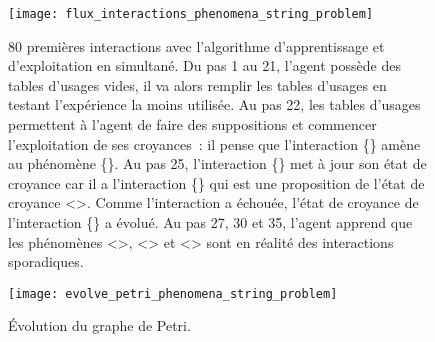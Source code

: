 \documentclass{llncs}
\begin{document}
\begin{figure}
		\centering
		\texttt{[image: flux\_interactions\_phenomena\_string\_problem]}
		\caption{80 premières interactions avec l'algorithme d'apprentissage et d'exploitation en simultané.
			Du pas 1 au 21, l'agent possède des tables d'usages vides, il va alors remplir les tables d'usages en testant l'expérience la moins utilisée. Au pas 22, les tables d'usages permettent à l'agent de faire des suppositions et commencer l'exploitation de ses croyances~: il pense que l'interaction \{\triangleBleu\} amène au phénomène \{\triangleBlanc\}. Au pas 25, l'interaction \{\triangleBleu\} met à jour son état de croyance car il a \intended l'interaction \{\rondBleu\} qui est une proposition de l'état de croyance <\triangleBlanc>. Comme l'interaction a échouée, l'état de croyance de l'interaction \{\triangleBleu\} a évolué. Au pas 27, 30 et 35, l'agent apprend que les phénomènes <\rondBleu>, <\triangleBlanc> et <\rondBlanc> sont en réalité des interactions sporadiques. 
			}
		\label{fig:flux_interactions_phenomena_string_problem}
\end{figure}


\begin{figure}
	\centering
	\texttt{[image: evolve\_petri\_phenomena\_string\_problem]}
	\caption{Évolution du graphe de Petri.}
	\label{fig:evole_petri_phenomenology_string_problem}
\end{figure}
\end{document}
